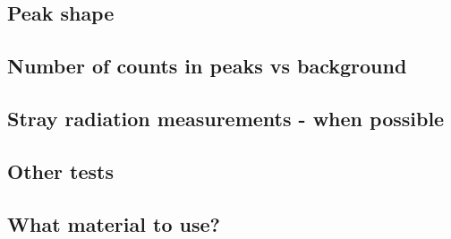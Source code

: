 

\subsection{Peak shape}
\label{theory:qc:peakshape}


\subsection{Number of counts in peaks vs background}
\label{theory:qc:counts}



\subsection{Stray radiation measurements - when possible}
\label{theory:qc:stray}


\subsection{Other tests}








\subsection{What material to use?}









